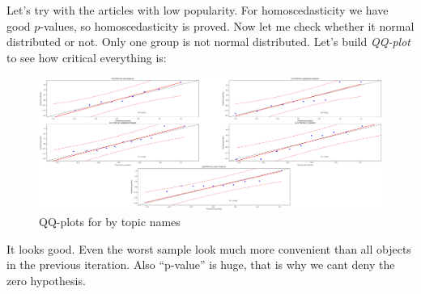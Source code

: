 \documentclass[12pt]{report}
\begin{document}
\par 
Let's try with the articles with low popularity. For homoscedasticity we have good $p$-values, so homoscedasticity is proved. Now let me check whether it normal distributed or not. Only one group is not normal distributed. Let's build \emph{QQ-plot} to see how critical everything is:
\begin{figure}[H]
\centering
  \includegraphics[scale=0.2]{qq.png}
\caption{QQ-plots for by topic names}
\end{figure}
It looks good. Even the worst sample look much more convenient than all objects in the previous iteration. Also ``p-value'' is huge, that is why we cant deny the zero hypothesis.
\end{document}

